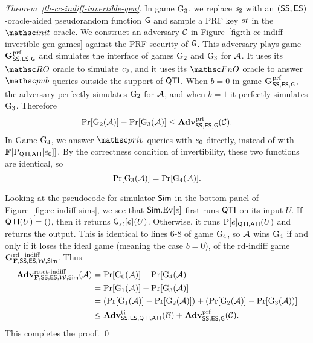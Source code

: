 \begin{proof}[Theorem~\ref{th-cc-indiff-invertible-gen}]
	In game $\textnormal{G}_3$, we replace $\mathit{s}_2$ with an $(\mathsf{SS},\mathsf{ES})$-oracle-aided pseudorandom function $\mathsf{G}$ and sample a PRF key $st$ in the $\Initialize$ oracle. We construct an adversary $\mathcal{C}$ in Figure~\ref{fig:th-cc-indiff-invertible-gen-games} against the PRF-security of $\mathsf{G}$. This adversary plays game $\mathbf{G}^{\mathrm{prf}}_{\mathsf{SS},\mathsf{ES},\mathsf{G}}$ and simulates the interface of games $\textnormal{G}_2$ and $\textnormal{G}_3$ for $\mathcal{A}$. It uses its $\RO$ oracle to simulate $\mathit{e}_0$, and it uses its $\FnO$ oracle to answer $\pub$ queries outside the support of $\mathsf{QTI}$. When $b=0$ in game $\mathbf{G}^{\mathrm{prf}}_{\mathsf{SS},\mathsf{ES},\mathsf{G}}$, the adversary perfectly simulates $\textnormal{G}_2$ for $\mathcal{A}$, and when $b=1$ it perfectly simulates $\textnormal{G}_3$.
	Therefore
	\[\Pr[\textnormal{G}_2(\mathcal{A})]-\Pr[\textnormal{G}_3(\mathcal{A})] \leq \mathbf{Adv}^{\mathrm{prf}}_{\mathsf{SS},\mathsf{ES},\mathsf{G}}(\mathcal{C}).\]
	In Game $\textnormal{G}_4$, we answer $\priv$ queries with $e_0$ directly, instead of with $\mathbf{F}[\mathrm{P}_{\mathsf{QTI},\mathsf{ATI}}[e_0]]$. By the correctness condition of invertibility, these two functions are identical, so
	\[\Pr[\textnormal{G}_3(\mathcal{A})] = \Pr[\textnormal{G}_4(\mathcal{A})].\]
	
	Looking at the pseudocode for simulator $\mathsf{Sim}$ in the bottom panel of Figure~\ref{fig:cc-indiff-sims}, we see that $\mathsf{Sim}.{\mathrm{Ev}}[e]$ first runs $\mathsf{QTI}$ on its input $U$. If $\mathsf{QTI}(U)=()$, then it returns $\mathsf{G}_{st}[e](U)$. Otherwise, it runs $\mathrm{P}[e]_{\mathsf{QTI},\mathsf{ATI}}(U)$ and returns the output. This is identical to lines 6-8 of game $\textnormal{G}_4$, so $\mathcal{A}$ wins $\textnormal{G}_4$ if and only if it loses the ideal game (meaning the case $b=0$), of the rd-indiff game $\mathbf{G}^{\mathrm{rd-indiff}}_{\mathbf{F},\mathsf{SS},\mathsf{ES},{\cal W},\mathsf{Sim}}$. Thus
	\begin{align*} \mathbf{Adv}^{\mathrm{reset\text{-}indiff}}_{\mathbf{F},\mathsf{SS},\mathsf{ES},{\cal W},\mathsf{Sim}}(\mathcal{A}) &= \Pr[\textnormal{G}_0(\mathcal{A})]-\Pr[\textnormal{G}_4(\mathcal{A}) \\
	&= \Pr[\textnormal{G}_1(\mathcal{A})] - \Pr[\textnormal{G}_3(\mathcal{A})]\\
	&= (\Pr[\textnormal{G}_1(\mathcal{A})] - \Pr[\textnormal{G}_2(\mathcal{A})] )+( \Pr[\textnormal{G}_2(\mathcal{A})] - \Pr[\textnormal{G}_3(\mathcal{A}))]\\
	&\leq \mathbf{Adv}^{\mathrm{ti}}_{\mathsf{SS},\mathsf{ES},\mathsf{QTI},\mathsf{ATI}}(\mathcal{B}) + \mathbf{Adv}^{\mathrm{prf}}_{\mathsf{SS},\mathsf{ES},\mathsf{G}}(\mathcal{C}) .
	\end{align*}
	This completes the proof. \qed
\end{proof}